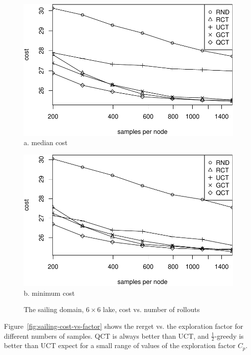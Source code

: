 \documentclass{article}
\begin{document}
\begin{figure}[t]
  \begin{minipage}[b]{0.5\linewidth}
    \centering
    \includegraphics[scale=0.45]{costs-size=6-group=median.pdf}\\
    a. median cost
  \end{minipage}
  \begin{minipage}[b]{0.5\linewidth}
    \centering
    \includegraphics[scale=0.45]{costs-size=6-group=minimum.pdf}\\
    b. minimum cost
  \end{minipage}
  \caption{The sailing domain, $6\times 6$ lake, cost vs. number of rollouts}
  \label{fig:sailing-cost-vs-nsamples}
\end{figure}

Figure~\ref{fig:sailing-cost-vs-factor} shows the rerget vs. the
exploration factor for different numbers of samples. QCT is always better than
UCT, and $\frac 1 2$-greedy is better than UCT expect for a small range of
values of the exploration factor $C_p$. 
\end{document}
